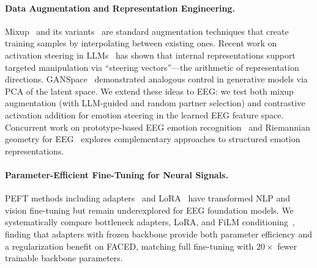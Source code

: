 \paragraph{Data Augmentation and Representation Engineering.}
Mixup~\cite{zhang2018mixup} and its variants~\cite{verma2019manifold,yao2022cmixup} are standard augmentation techniques that create training samples by interpolating between existing ones. Recent work on activation steering in LLMs~\cite{turner2023activation,rimsky2024steering} has shown that internal representations support targeted manipulation via ``steering vectors''---the arithmetic of representation directions. GANSpace~\cite{harkonnen2020ganspace} demonstrated analogous control in generative models via PCA of the latent space. We extend these ideas to EEG: we test both mixup augmentation (with LLM-guided and random partner selection) and contrastive activation addition for emotion steering in the learned EEG feature space. Concurrent work on prototype-based EEG emotion recognition~\cite{pgnapl2025} and Riemannian geometry for EEG~\cite{riemannian_eeg2025} explores complementary approaches to structured emotion representations.

\paragraph{Parameter-Efficient Fine-Tuning for Neural Signals.}
PEFT methods including adapters~\cite{houlsby2019adapters} and LoRA~\cite{hu2022lora} have transformed NLP and vision fine-tuning but remain underexplored for EEG foundation models. We systematically compare bottleneck adapters, LoRA, and FiLM conditioning~\cite{perez2018film}, finding that adapters with frozen backbone provide both parameter efficiency and a regularization benefit on FACED, matching full fine-tuning with $20\times$ fewer trainable backbone parameters.
